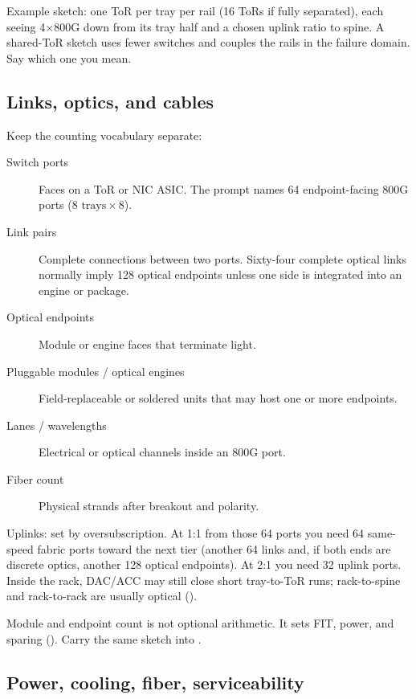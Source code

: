 Example sketch: one ToR per tray per rail (16 ToRs if fully separated), each
seeing 4$\times$800G down from its tray half and a chosen uplink ratio to
spine. A shared-ToR sketch uses fewer switches and couples the rails in the
failure domain. Say which one you mean.

\subsection{Links, optics, and cables}
\label{sec:hpc-rack-optics}

Keep the counting vocabulary separate:

\begin{description}
\item[Switch ports] Faces on a ToR or NIC ASIC. The prompt names 64
      endpoint-facing 800G ports ($8\text{ trays}\times 8$).
\item[Link pairs] Complete connections between two ports. Sixty-four complete
      optical links normally imply 128 optical endpoints unless one side is
      integrated into an engine or package.
\item[Optical endpoints] Module or engine faces that terminate light.
\item[Pluggable modules / optical engines] Field-replaceable or soldered units
      that may host one or more endpoints.
\item[Lanes / wavelengths] Electrical or optical channels inside an 800G port.
\item[Fiber count] Physical strands after breakout and polarity.
\end{description}

Uplinks: set by oversubscription. At 1:1 from those 64 ports you need 64
same-speed fabric ports toward the next tier (another 64 links and, if both
ends are discrete optics, another 128 optical endpoints). At 2:1 you need 32
uplink ports. Inside the rack, DAC/ACC may still close short tray-to-ToR runs;
rack-to-spine and rack-to-rack are usually optical
().

Module and endpoint count is not optional arithmetic. It sets FIT, power, and
sparing (). Carry the same sketch
into .

\subsection{Power, cooling, fiber, serviceability}
\label{sec:hpc-rack-ops}


